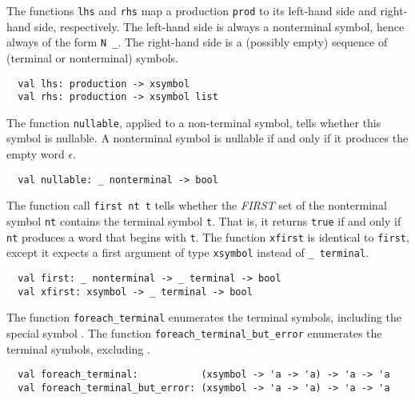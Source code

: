 \documentclass[onecolumn,11pt,nocopyrightspace,preprint]{sigplanconf}
\begin{document}

The functions \verb+lhs+ and \verb+rhs+ map a production \verb+prod+ to
its left-hand side and right-hand side, respectively. The left-hand side
is always a nonterminal symbol, hence always of the form \verb+N _+. The
right-hand side is a (possibly empty) sequence of (terminal or nonterminal)
symbols.
%
\begin{verbatim}
  val lhs: production -> xsymbol
  val rhs: production -> xsymbol list
\end{verbatim}
%


The function \verb+nullable+, applied to a non-terminal symbol,
tells whether this symbol is nullable. A nonterminal symbol is nullable if and
only if it produces the empty word $\epsilon$.
%
\begin{verbatim}
  val nullable: _ nonterminal -> bool
\end{verbatim}


The function call \verb+first nt t+ tells whether the \emph{FIRST} set of the
nonterminal symbol \verb+nt+ contains the terminal symbol \verb+t+. That is,
it returns \verb+true+ if and only if \verb+nt+ produces a word that begins
with \verb+t+. The function \verb+xfirst+ is identical to \verb+first+, except
it expects a first argument of type \verb+xsymbol+ instead of \verb+_ terminal+.
%
\begin{verbatim}
  val first: _ nonterminal -> _ terminal -> bool
  val xfirst: xsymbol -> _ terminal -> bool
\end{verbatim}


The function \verb+foreach_terminal+ enumerates the terminal symbols, including the special symbol \error.
The function \verb+foreach_terminal_but_error+ enumerates the terminal symbols, excluding \error.
\begin{verbatim}
  val foreach_terminal:           (xsymbol -> 'a -> 'a) -> 'a -> 'a
  val foreach_terminal_but_error: (xsymbol -> 'a -> 'a) -> 'a -> 'a
\end{verbatim}

\end{document}

